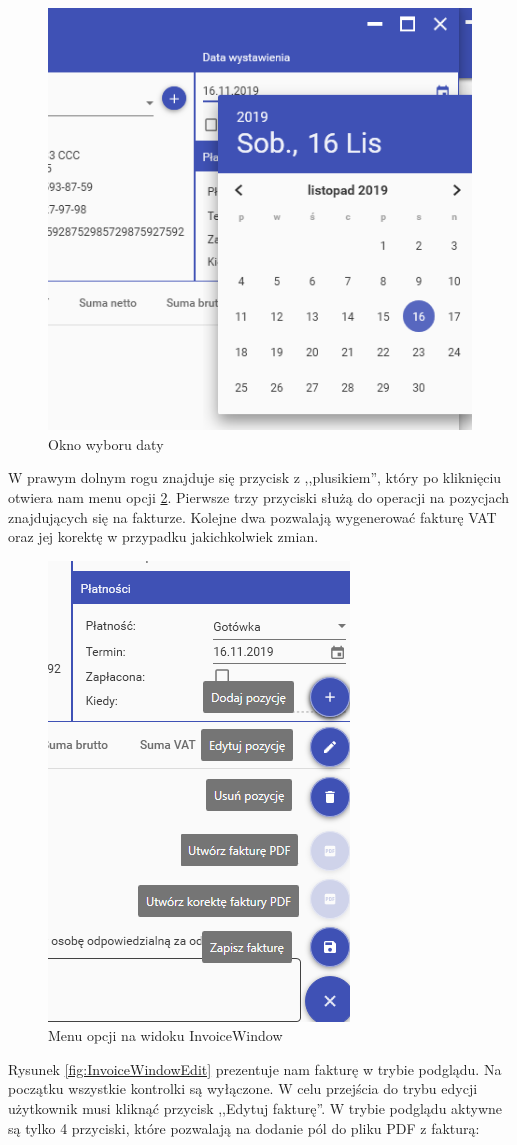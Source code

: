 \begin{figure}[ht!]
\centering
  \includegraphics[width=0.5\linewidth]{Rysunki/Invoice/InvoiceSelectDate.png}
  \caption{Okno wyboru daty}
  \label{fig:InvoiceWindowDate}
\end{figure}

W prawym dolnym rogu znajduje się przycisk z ,,plusikiem'', który po kliknięciu otwiera nam menu opcji \ref{fig:InvoiceWindowMenu}. Pierwsze trzy przyciski służą do operacji na pozycjach znajdujących się na fakturze. Kolejne dwa pozwalają wygenerować fakturę VAT oraz jej korektę w przypadku jakichkolwiek zmian.

\begin{figure}[ht!]
\centering
  \includegraphics[width=0.5\linewidth]{Rysunki/Invoice/InvoiceMenu.png}
  \caption{Menu opcji na widoku InvoiceWindow}
  \label{fig:InvoiceWindowMenu}
\end{figure}

Rysunek \ref{fig:InvoiceWindowEdit} prezentuje nam fakturę w trybie podglądu. Na początku wszystkie kontrolki są wyłączone. W celu przejścia do trybu edycji użytkownik musi kliknąć przycisk ,,Edytuj fakturę''. W trybie podglądu aktywne są tylko 4 przyciski, które pozwalają na dodanie pól do pliku PDF z fakturą: 

